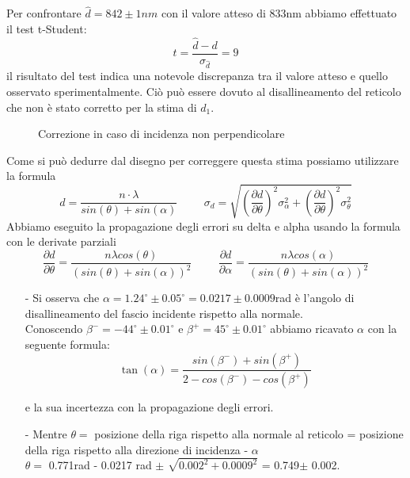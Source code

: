 \documentclass[a4paper]{article}
\theoremstyle{definition}
\begin{document}
\noindent Per confrontare \(\hat{d} = 842 \pm 1nm\) con il valore atteso di 833nm abbiamo effettuato il test t-Student:
\[ t = \frac{\hat{d} - d}{\sigma_{\hat{d}} }= 9 \]
il risultato del test indica una notevole discrepanza tra il valore atteso e quello osservato sperimentalmente. Ciò può essere dovuto al disallineamento del reticolo che non è stato corretto per la stima di \(d_{1}\).

\begin{figure}[!ht]
    	\captionsetup{labelformat=empty}
        \caption{Correzione in caso di incidenza non perpendicolare}
\end{figure}

\noindent Come si può dedurre dal disegno per correggere questa stima possiamo utilizzare la formula 
\[d = \frac{n \cdot \lambda}{sin(\theta) + sin(\alpha)} \hspace{1cm} \sigma_{d} = \sqrt{   \left(\frac{\partial d}{\partial \theta}\right)^{2}\sigma_{\alpha}^{2} + \left(\frac{\partial d}{\partial \theta}\right)^{2} \sigma_{\theta}^{2} }\]
\noindent Abbiamo eseguito la propagazione degli errori su delta e alpha usando la formula con le derivate parziali 
\[\frac{\partial d}{\partial \theta} = \frac{n \lambda cos(\theta)}{( sin(\theta)+sin(\alpha) )^{2}} \hspace{1cm} \frac{\partial d}{\partial \alpha}= \frac{n \lambda cos(\alpha)}{(sin(\theta)+sin(\alpha))^{2}}\]


\begin{enumerate}
    \item [-] Si osserva che \(\alpha = 1.24^{\circ} \pm 0.05 ^{\circ} = 0.0217 \pm  0.0009\)rad è l'angolo di disallineamento del fascio incidente rispetto alla normale. \\

Conoscendo \(\beta^{-} = -44^{\circ} \pm 0.01 ^{\circ}\) e \(\beta^{+} = 45^{\circ} \pm 0.01^{\circ}\) abbiamo ricavato \(\alpha\) con la seguente formula: 
\[\tan(\alpha) = \frac{sin(\beta^{-}) + sin(\beta^{+})}{2 - cos(\beta^{-}) - cos(\beta^{+})}\]
 
e la sua incertezza con la propagazione degli errori. \\

    \item[-] Mentre \(\theta =\) posizione della riga rispetto alla normale al reticolo = posizione della riga rispetto alla direzione di incidenza - \(\alpha\) \\ \(\theta = \) 0.771rad - 0.0217 rad \(\pm\) \(\sqrt{0.002^{2} + 0.0009^{2}}\) = 0.749\( \pm\) 0.002. \\
\end{enumerate}
\end{document}
